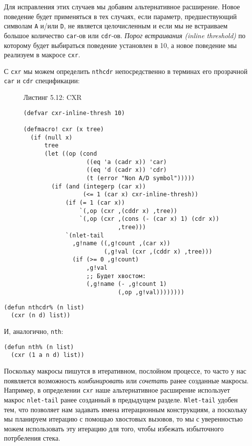Для исправления этих случаев мы добавим альтернативное расширение. Новое поведение будет применяться в тех случаях, если параметр, предшествующий символам \verb"A" и/или \verb"D", не является целочисленным и если мы не встраиваем большое количество \verb"car"-ов или \verb"cdr"-ов. \emph{Порог встраивания (inline threshold)} по которому будет выбираться поведение установлен в 10, а новое поведение мы реализуем в макросе \verb"cxr".

С \verb"cxr" мы можем определить \verb"nthcdr" непосредственно в терминах его прозрачной \verb"car" и \verb"cdr" спецификации:

\begin{figure}Листинг 5.12: CXR\label{listing_5.12}
\listbegin
\begin{verbatim}
(defvar cxr-inline-thresh 10)

(defmacro! cxr (x tree)
  (if (null x)
      tree
      (let ((op (cond
                  ((eq 'a (cadr x)) 'car)
                  ((eq 'd (cadr x)) 'cdr)
                  (t (error "Non A/D symbol")))))
        (if (and (integerp (car x))
                 (<= 1 (car x) cxr-inline-thresh))
            (if (= 1 (car x))
                `(,op (cxr ,(cddr x) ,tree))
                `(,op (cxr ,(cons (- (car x) 1) (cdr x))
                           ,tree)))
            `(nlet-tail
              ,g!name ((,g!count ,(car x))
                       (,g!val (cxr ,(cddr x) ,tree)))
              (if (>= 0 ,g!count)
                  ,g!val
                  ;; Будет хвостом:
                  (,g!name (- ,g!count 1)
                           (,op ,g!val))))))))
\end{verbatim}
\listend
\end{figure}

\begin{verbatim}
(defun nthcdr% (n list)
  (cxr (n d) list))
\end{verbatim}

И, аналогично, \verb"nth":

\begin{verbatim}
(defun nth% (n list)
  (cxr (1 a n d) list))
\end{verbatim}

Поскольку макросы пишутся в итеративном, послойном процессе, то часто у нас появляется возможность \emph{комбинировать} или \emph{сочетать} ранее созданные макросы. Например, в определении \verb"cxr" наше альтернативное расширение использует макрос \verb"nlet-tail" ранее созданный в предыдущем разделе. \verb"Nlet-tail" удобен тем, что позволяет нам задавать имена итерационным конструкциям, а поскольку мы планируем итерацию с помощью хвостовых вызовов, то мы с уверенностью можем использовать эту итерацию для того, чтобы избежать избыточного потрбеления стека.


